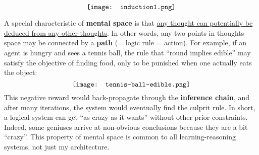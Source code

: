 \begin{preview}
\begin{minipage}{\textwidth}
\setcounter{mpfootnote}{1}
\begin{equation}
\vcenter{\hbox{\texttt{[image: induction1.png]}}}
\end{equation}

A special characteristic of \textbf{mental space} is that \uline{any thought can potentially be deduced from any other thoughts}.  In other words, any two points in thoughts space may be connected by a \textbf{path} (= logic rule = action).  For example, if an agent is hungry and sees a tennis ball, the rule that ``round implies edible'' may satisfy the objective of finding food, only to be punished when one actually eats the object:
\begin{equation}
\vcenter{\hbox{\texttt{[image: tennis-ball-edible.png]}}}
\end{equation}
This negative reward would back-propagate through the \textbf{inference chain}, and after many iterations, the system would eventually find the culprit rule.  In short, a logical system can get ``as crazy as it wants'' without other prior constraints.  Indeed, some geniuses arrive at non-obvious conclusions because they are a bit ``crazy''.  This property of mental space is common to all learning-reasoning systems, not just my architecture.

\end{minipage}
\end{preview}


